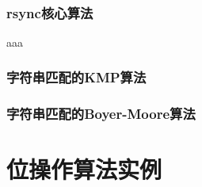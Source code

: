\documentclass[a4paper,11pt]{article}
\begin{document}
  \tt %
  \pagestyle{header}
  \sybmaketitle
  \tableofcontents
  \newpage

\pagestyle{main}
\setcounter{page}{1}

\section[rsync核心算法]{rsync核心算法}
aaa





\section[字符串匹配的KMP算法]{字符串匹配的KMP算法}

\section[字符串匹配的Boyer-Moore算法]{字符串匹配的Boyer-Moore算法}


\part[位操作算法实例]{位操作算法实例}


\end{document}
